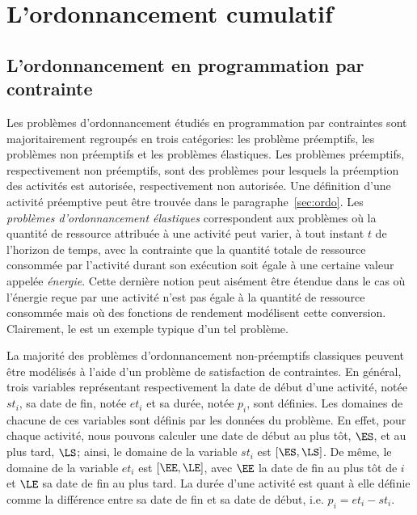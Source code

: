 \section{L'ordonnancement cumulatif}
\label{sec:cumu}

\subsection{L'ordonnancement en programmation par contrainte}
\label{sec:cumu_ordo}

Les problèmes d'ordonnancement étudiés en programmation par
contraintes sont majoritairement regroupés en trois catégories: les
problème préemptifs, les problèmes non préemptifs et les problèmes
élastiques. Les problèmes préemptifs, respectivement non préemptifs,
sont des problèmes pour lesquels la préemption des activités est
autorisée, respectivement non autorisée. Une définition d'une activité
préemptive peut être trouvée dans le paragraphe~\ref{sec:ordo}. Les
{\it problèmes d'ordonnancement élastiques} correspondent aux
problèmes où la quantité de ressource attribuée à une activité peut
varier, à tout instant $t$ de l'horizon de temps, avec la contrainte
que la quantité totale de ressource consommée par l'activité durant
son exécution soit égale à une certaine valeur appelée {\it
  énergie}. Cette dernière notion peut aisément être étendue dans le
cas où l'énergie reçue par une activité n'est pas égale à la quantité
de ressource consommée mais où des fonctions de rendement modélisent 
cette conversion. Clairement, le \CECSP est un exemple typique d'un
tel problème. 

La majorité des problèmes d'ordonnancement non-préemptifs classiques
peuvent être modélisés à l'aide d'un problème de satisfaction de
contraintes. En général, trois variables représentant respectivement
la date de début d'une activité, notée $st_i$, sa date de fin, notée
$et_i$ et sa durée, notée $p_i$, sont définies. Les domaines de
chacune de ces variables sont définis par les données du problème. En
effet, pour chaque activité, nous pouvons calculer une date de début
au plus tôt, $\ES$, et au plus tard, $\LS$; ainsi, le domaine de la
variable $st_i$ est $[\ES,\LS]$. De même, le domaine de la variable
$et_i$ est $[\EE,\LE]$, avec $\EE$ la date de fin au plus tôt de $i$
et $\LE$ sa date de fin au plus tard. La durée d'une activité est
quant à elle définie comme la différence entre sa date de fin et sa
date de début, i.e. $p_i=et_i-st_i$.

